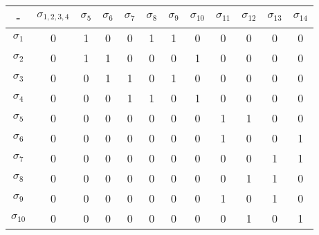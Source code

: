 \begin{enumerate}
    \begin{center}
        \begin{tabular}{|c|c|c|c|c|c|c|c|c|c|c|c|}
            \hline
            -             & $\sigma_{1,2,3,4}$ & $\sigma_5$ & $\sigma_6$ & $\sigma_7$ & $\sigma_8$ & $\sigma_9$ & $\sigma_{10}$ & $\sigma_{11}$ & $\sigma_{12}$ & $\sigma_{13}$ & $\sigma_{14}$ \\ \hline
            $\sigma_1$    & 0                  & 1          & 0          & 0          & 1          & 1          & 0             & 0             & 0             & 0             & 0             \\ \hline
            $\sigma_2$    & 0                  & 1          & 1          & 0          & 0          & 0          & 1             & 0             & 0             & 0             & 0             \\ \hline
            $\sigma_3$    & 0                  & 0          & 1          & 1          & 0          & 1          & 0             & 0             & 0             & 0             & 0             \\ \hline
            $\sigma_4$    & 0                  & 0          & 0          & 1          & 1          & 0          & 1             & 0             & 0             & 0             & 0             \\ \hline
            $\sigma_5$    & 0                  & 0          & 0          & 0          & 0          & 0          & 0             & 1             & 1             & 0             & 0             \\ \hline
            $\sigma_6$    & 0                  & 0          & 0          & 0          & 0          & 0          & 0             & 1             & 0             & 0             & 1             \\ \hline
            $\sigma_7$    & 0                  & 0          & 0          & 0          & 0          & 0          & 0             & 0             & 0             & 1             & 1             \\ \hline
            $\sigma_8$    & 0                  & 0          & 0          & 0          & 0          & 0          & 0             & 0             & 1             & 1             & 0             \\ \hline
            $\sigma_9$    & 0                  & 0          & 0          & 0          & 0          & 0          & 0             & 1             & 0             & 1             & 0             \\ \hline
            $\sigma_{10}$ & 0                  & 0          & 0          & 0          & 0          & 0          & 0             & 0             & 1             & 0             & 1             \\ \hline

\end{tabular}
\end{center}
\end{enumerate}
